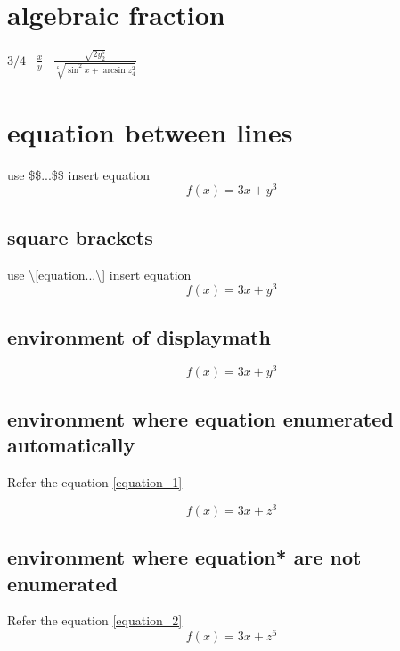 \documentclass{article}
\begin{document}
    \section{algebraic fraction}
    \(3/4\)
    \ \(\frac{x}{y}\)
    \ \(\frac{\sqrt{2y_2^5}}{\sqrt[6]{\sin^2 x+\arcsin z_4^2}}\)
    \section{equation between lines}
    use \$\$...\$\$ insert equation
    $$f(x)=3x+y^3$$    
    
    \subsection{square brackets}
    use \textbackslash [equation...\textbackslash ] insert equation
    \[f(x)=3x+y^3\] %
    
    \subsection{environment of displaymath}
    \begin{displaymath}
        f(x)=3x+y^3
    \end{displaymath}
    
    \subsection{environment where equation enumerated automatically}
    Refer the equation \ref{equation_1}

    \begin{equation}
        f(x)=3x+z^3
        \label{equation_1}
    \end{equation}
    
    \subsection{environment where equation* are not enumerated }
    Refer the equation \ref{equation_2}
    \begin{equation} %
        f(x)=3x+z^6
        \label{equation_2}
    \end{equation}
\end{document}
